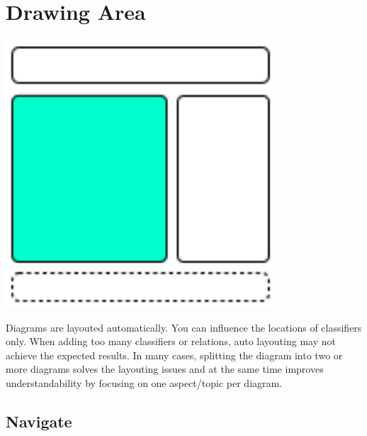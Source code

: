 \section{Drawing Area}

\includegraphics[width=10cm]{main_window_sketch_2.png}

Diagrams are layouted automatically. You can influence the locations of classifiers only.
When adding too many classifiers or relations, auto layouting may not achieve the expected results.
In many cases, splitting the diagram into two or more diagrams solves the layouting issues and
at the same time improves understandability by focusing on one aspect/topic per diagram.

\subsection{Navigate}

